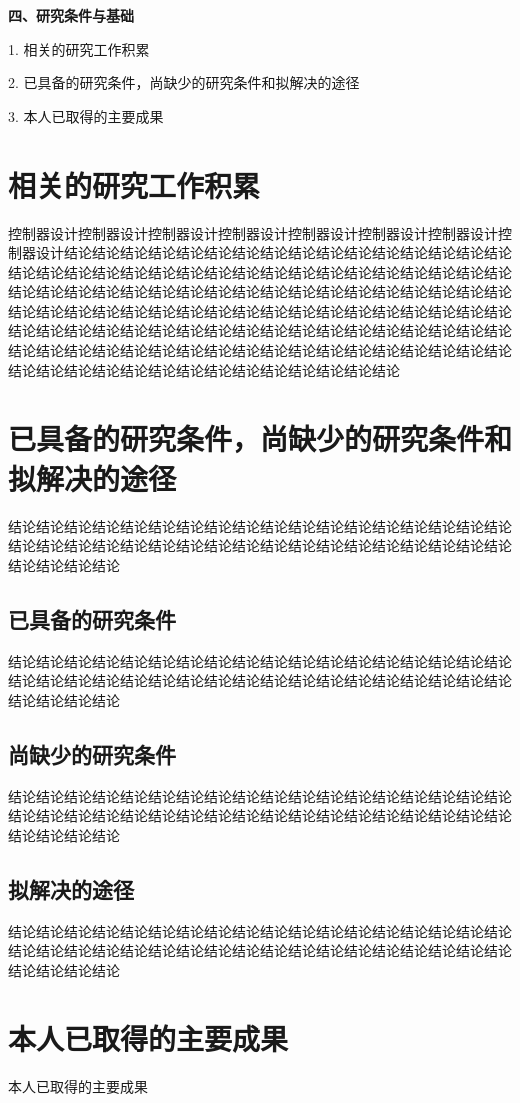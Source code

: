 \textbf{\fangsong\xiaosihao 四、研究条件与基础}
\vspace{-0.30cm}
\begin{ubox}
	\setcounter{section}{0}
	\setcounter{figure}{0}
	\setcounter{table}{0}
	\setlength{\parindent}{0em} 
	1. 相关的研究工作积累
	\vspace{-0.25cm}
	
	2. 已具备的研究条件，尚缺少的研究条件和拟解决的途径
	\vspace{-0.25cm}
	
	3. 本人已取得的主要成果
	
	\setlength{\parindent}{2em} 
	\section{相关的研究工作积累}
	控制器设计控制器设计控制器设计控制器设计控制器设计控制器设计控制器设计控制器设计结论结论结论结论结论结论结论结论结论结论结论结论结论结论结论结论结论结论结论结论结论结论结论结论结论结论结论结论结论结论结论结论结论结论结论结论结论结论结论结论结论结论结论结论结论结论结论结论结论结论结论结论结论结论结论结论结论结论结论结论结论结论结论结论结论结论结论结论结论结论结论结论结论结论结论结论结论结论结论结论结论结论结论结论结论结论结论结论结论结论结论结论结论结论结论结论结论结论结论结论结论结论结论结论结论结论结论结论结论结论结论结论结论结论结论结论结论结论结论结论
	\section{已具备的研究条件，尚缺少的研究条件和拟解决的途径}
	结论结论结论结论结论结论结论结论结论结论结论结论结论结论结论结论结论结论结论结论结论结论结论结论结论结论结论结论结论结论结论结论结论结论结论结论结论结论结论结论
\subsection{已具备的研究条件}
结论结论结论结论结论结论结论结论结论结论结论结论结论结论结论结论结论结论结论结论结论结论结论结论结论结论结论结论结论结论结论结论结论结论结论结论结论结论结论结论
\subsection{尚缺少的研究条件}
结论结论结论结论结论结论结论结论结论结论结论结论结论结论结论结论结论结论结论结论结论结论结论结论结论结论结论结论结论结论结论结论结论结论结论结论结论结论结论结论
\subsection{拟解决的途径}
结论结论结论结论结论结论结论结论结论结论结论结论结论结论结论结论结论结论结论结论结论结论结论结论结论结论结论结论结论结论结论结论结论结论结论结论结论结论结论结论
\section{本人已取得的主要成果}
本人已取得的主要成果
\end{ubox}